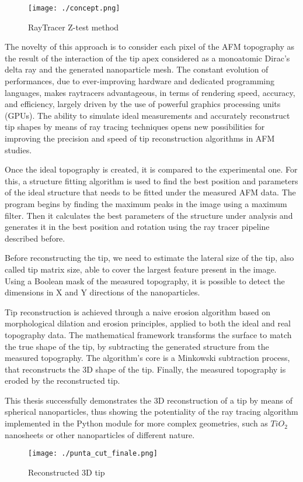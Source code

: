 \documentclass[12pt]{report} %
\begin{document}
\begin{figure}[h]
    \centering
    \texttt{[image: ./concept.png]}
    \caption{RayTracer Z-test method}
\end{figure}

\newpage

\noindent The novelty of this approach is to consider each pixel of the AFM topography as the result of the interaction of the tip apex considered as a monoatomic Dirac’s delta ray and the generated nanoparticle mesh. The constant evolution of performances, due to ever-improving hardware and dedicated programming languages, makes raytracers advantageous, in terms of rendering speed, accuracy, and efficiency, largely driven by the use of powerful graphics processing units (GPUs). The ability to simulate ideal measurements and accurately reconstruct tip shapes by means of ray tracing techniques opens new possibilities for improving the precision and speed of tip reconstruction algorithms in AFM studies.

Once the ideal topography is created, it is compared to the experimental one. For this, a structure fitting algorithm is used to find the best position and parameters of the ideal structure that needs to be fitted under the measured AFM data. The program begins by finding the maximum peaks in the image using a maximum filter. Then it calculates the best parameters of the structure under analysis and generates it in the best position and rotation using the ray tracer pipeline described before.

Before reconstructing the tip, we need to estimate the lateral size of the tip, also called tip matrix size, able to cover the largest feature present in the image. Using a Boolean mask of the measured topography, it is possible to detect the dimensions in X and Y directions of the nanoparticles.

Tip reconstruction is achieved through a naive erosion algorithm based on morphological dilation and erosion principles, applied to both the ideal and real topography data. The mathematical framework transforms the surface to match the true shape of the tip, by subtracting the generated structure from the measured topography. The algorithm's core is a Minkowski subtraction process, that reconstructs the 3D shape of the tip. Finally, the measured topography is eroded by the reconstructed tip.

This thesis successfully demonstrates the 3D reconstruction of a tip by means of spherical nanoparticles, thus showing the potentiality of the ray tracing algorithm implemented in the Python module for more complex geometries, such as $TiO_2$ nanosheets or other nanoparticles of different nature.

\begin{figure}[h]
    \centering
    \texttt{[image: ./punta\_cut\_finale.png]}
    \caption{Reconstructed 3D tip}
\end{figure}
\end{document}
